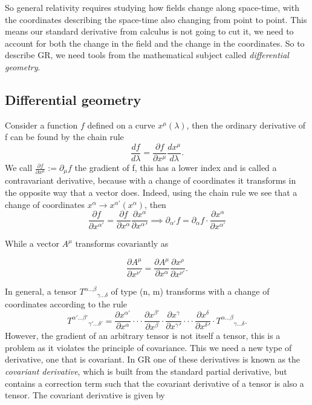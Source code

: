 So general relativity requires studying how fields change along space-time, with the coordinates describing the space-time also changing from point to point. This means our standard derivative from calculus is not going to cut it, we need to account for both the change in the field and the change in the coordinates. So to describe GR, we need tools from the mathematical subject called \textit{differential geometry}. 

\subsection{Differential geometry}

Consider a function $f$ defined on a curve $x^\mu(\lambda)$, then the ordinary derivative of f can be found by the chain rule
\begin{equation}
    \frac{df}{d\lambda} = \frac{\partial f}{\partial x^\mu} \frac{dx^\mu}{d\lambda}.
\end{equation}
We call $\frac{\partial f}{\partial x^\mu} := \partial_\mu f$ the gradient of f, this has a lower index and is called a contravariant derivative, because with a change of coordinates it transforms in the opposite way that a vector does. Indeed, using the chain rule we see that a change of coordinates $x^\alpha \rightarrow x^{\alpha'}(x^\alpha)$, then 
\begin{equation}
    \frac{\partial f}{\partial x^{\alpha '}} = \frac{\partial f}{\partial   x^\alpha} \frac{\partial x^\alpha}{\partial x^\alpha'}
    \implies
    \partial_{\alpha'} f = \partial_{\alpha} f \cdot \frac{\partial x^{\alpha}}{\partial x^{\alpha'}}
\end{equation}

While a vector $A^\mu$ transforms covariantly as 

\begin{equation}
    \frac{\partial A^\mu}{\partial x^{\nu'}} = \frac{\partial A^\mu}{\partial x^\alpha} \frac{\partial x^\rho}{\partial x^{\nu'}}.
\end{equation}

In general, a tensor ${T^{\alpha ... \beta}}_{\gamma ... \delta}$ of type (n, m) transforms with a change of coordinates according to the rule
\begin{equation}
    {T^{\alpha' ... \beta'}}_{\gamma' ... \delta'}=\frac{\partial x^{\alpha'}}{\partial x^\alpha} \cdot\cdot\cdot \frac{\partial x^{\beta'}}{\partial x^\beta}  \cdot \frac{\partial x^{\gamma}}{\partial x^\gamma'} \cdot\cdot\cdot \frac{\partial x^{\delta}}{\partial x^\delta'} \cdot {T^{\alpha ... \beta}}_{\gamma ... \delta}.
\end{equation}
However, the gradient of an arbitrary tensor is not itself a tensor, this is a problem as it violates the principle of covariance. This we need a new type of derivative, one that is covariant. In GR one of these derivatives is known as the \textit{covariant derivative}, which is built from the standard partial derivative, but contains a correction term such that the covariant derivative of a tensor is also a tensor. The covariant derivative is given by

